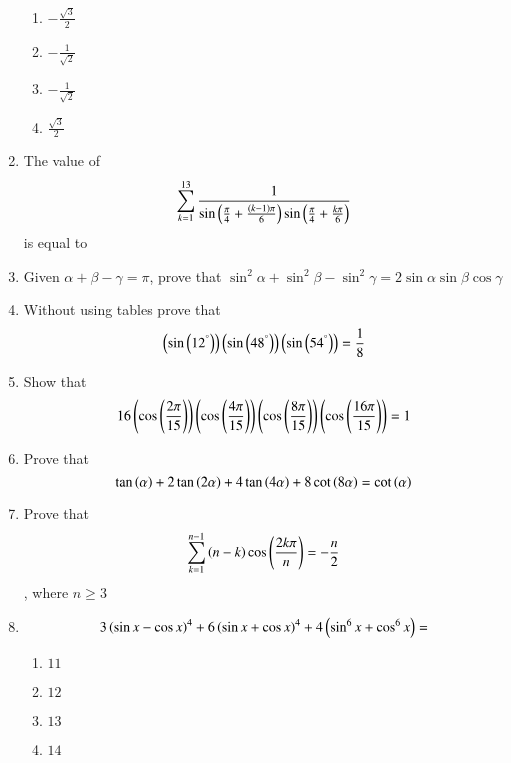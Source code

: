 \begin{enumerate}[label=\thesubsection.\arabic*,ref=\thesubsection.\theenumi]
        \hfill{}
        \begin{enumerate}
                \item $-\frac{\sqrt{3}}{2}$
                \item $-\frac{1}{\sqrt{2}}$
                \item $-\frac{1}{\sqrt{2}}$
                \item $\frac{\sqrt{3}}{2}$
        \end{enumerate}
\item The value of 
\begin{align*}
\sum_{k=1}^{13} \frac{1}{\sin\left(\frac{\pi}{4} + \frac{\left(k-1\right)\pi}{6}\right)\sin\left(\frac{\pi}{4} + \frac{k\pi}{6}\right)}
\end{align*}
is equal to
\hfill{}
\begin{enumerate}
\end{enumerate}
\item Given $\alpha+\beta-\gamma=\pi$, prove that $\sin^2{\alpha}+\sin^2{\beta}-\sin^2{\gamma}=2\sin{\alpha}\sin{\beta}\cos{\gamma}$ \hfill{}
\item Without using tables prove that 
$$ 
\left(\sin\left(12^{\degree}\right)\right)\left(\sin\left(48^{\degree}\right)\right)\left(\sin\left(54^{\degree}\right)\right)= \frac{1}{8}
$$
\hfill {}
\item Show that 
$$
16\left(\cos\left(\frac{2\pi}{15}\right)\right)\left(\cos\left(\frac{4\pi}{15}\right)\right)\left(\cos\left(\frac{8\pi}{15}\right)\right)\left(\cos\left(\frac{16\pi}{15}\right)\right)=1
$$
\hfill{}
\item Prove that 
$$
\tan \left(\alpha\right)+2\tan \left(2\alpha\right)+4\tan \left(4\alpha\right)+8\cot \left(8\alpha\right)=\cot \left(\alpha\right)
$$
\hfill{}
\item Prove that 
$$
\sum_{k=1}^{n-1} \left(n-k\right)\cos\left( \frac{2k\pi}{n}\right)=-\frac{n}{2}
$$
, where $n\ge3$
\hfill{}
	\item 
		\begin{align*}
		3\left(\sin{x} - \cos{x}\right)^4 + 6\left(\sin{x} + \cos{x}\right)^4 +  4\left(\sin^6{x}+\cos^6{x}\right) =
	\end{align*}
        \hfill{}
        \begin{multicols}{4}
\begin{enumerate}
                \item $11$
                \item $12$
                \item $13$
                \item $14$
        \end{enumerate}
\end{multicols}   

\end{enumerate}
